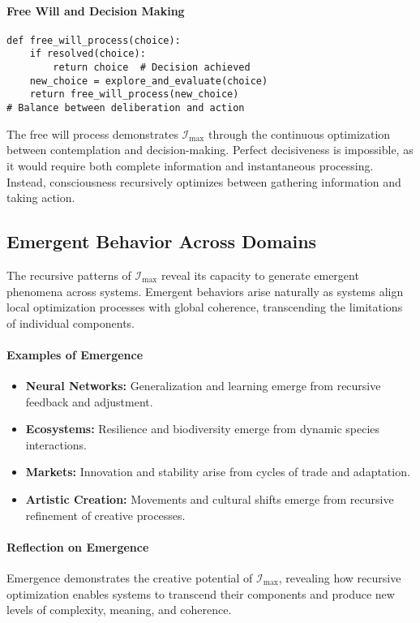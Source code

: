 \documentclass[12pt]{article}
\begin{document}
\paragraph{Free Will and Decision Making}
\begin{verbatim}
def free_will_process(choice):
    if resolved(choice):
        return choice  # Decision achieved
    new_choice = explore_and_evaluate(choice)
    return free_will_process(new_choice)
# Balance between deliberation and action
\end{verbatim}

The free will process demonstrates \(\mathcal{I}_{\text{max}}\) through the continuous optimization between contemplation and decision-making. Perfect decisiveness is impossible, as it would require both complete information and instantaneous processing. Instead, consciousness recursively optimizes between gathering information and taking action.

\subsection{Emergent Behavior Across Domains}
The recursive patterns of \(\mathcal{I}_{\text{max}}\) reveal its capacity to generate emergent phenomena across systems. Emergent behaviors arise naturally as systems align local optimization processes with global coherence, transcending the limitations of individual components.

\paragraph{Examples of Emergence}
\begin{itemize}
    \item \textbf{Neural Networks:} Generalization and learning emerge from recursive feedback and adjustment.
    \item \textbf{Ecosystems:} Resilience and biodiversity emerge from dynamic species interactions.
    \item \textbf{Markets:} Innovation and stability arise from cycles of trade and adaptation.
    \item \textbf{Artistic Creation:} Movements and cultural shifts emerge from recursive refinement of creative processes.
\end{itemize}

\paragraph{Reflection on Emergence}
Emergence demonstrates the creative potential of \(\mathcal{I}_{\text{max}}\), revealing how recursive optimization enables systems to transcend their components and produce new levels of complexity, meaning, and coherence.
\end{document}
